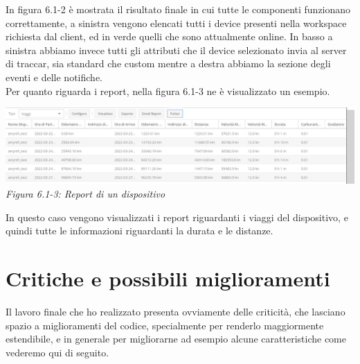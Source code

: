 \documentclass[a4paper,titlepage,12pt]{book}
\begin{document}
In figura 6.1-2 è mostrata il risultato finale in cui tutte le componenti funzionano correttamente, a sinistra vengono elencati tutti i device presenti nella workspace richiesta dal client, ed in verde quelli che sono attualmente online. In basso a sinistra abbiamo invece tutti gli attributi che il device selezionato invia al server di traccar, sia standard che custom mentre a destra abbiamo la sezione degli eventi e delle notifiche.\\
Per quanto riguarda i report, nella figura 6.1-3 ne è visualizzato un esempio.

\begin{center}
\includegraphics[scale=0.3]{images/reports.png}\\ 
\textit{Figura 6.1-3: Report di un dispositivo}
\end{center}

In questo caso vengono visualizzati i report riguardanti i viaggi del dispositivo, e quindi tutte le informazioni riguardanti la durata e le distanze.


\section{\sffamily
Critiche e possibili miglioramenti}
Il lavoro finale che ho realizzato presenta ovviamente delle criticità, che lasciano spazio a miglioramenti del codice, specialmente per renderlo maggiormente estendibile, e in generale per migliorarne ad esempio alcune caratteristiche come vederemo qui di seguito.\\
\end{document}
